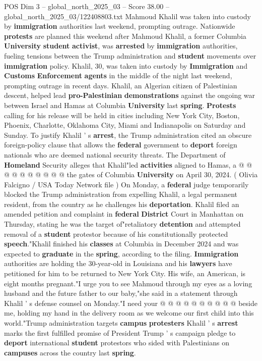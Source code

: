 \begin{textsample}{POS Dim 3 – global\_north\_2025\_03 – Score 38.00 – global\_north\_2025\_03/122408803.txt}  \label{ex:f3_pos_023}
Mahmoud Khalil was taken into custody by \textbf{immigration} authorities last weekend, prompting outrage.
Nationwide \textbf{protests} are planned this weekend after Mahmoud Khalil, a former Columbia \textbf{University} \textbf{student} \textbf{activist}, was \textbf{arrested} by \textbf{immigration} authorities, fueling tensions between the Trump administration and \textbf{student} movements over \textbf{immigration} policy.
Khalil, 30, was taken into custody by \textbf{Immigration} and \textbf{Customs} \textbf{Enforcement} \textbf{agents} in the middle of the night last weekend, prompting outrage in recent days.
Khalil, an Algerian citizen of Palestinian descent, helped lead \textbf{pro-Palestinian} \textbf{demonstrations} against the ongoing war between Israel and Hamas at Columbia \textbf{University} last \textbf{spring}. \textbf{Protests} calling for his release will be held in cities including New York City, Boston, Phoenix, Charlotte, Oklahoma City, Miami and Indianapolis on Saturday and Sunday.
To justify Khalil ' s \textbf{arrest}, the Trump administration cited an obscure foreign-policy clause that allows the \textbf{federal} government to \textbf{deport} foreign nationals who are deemed national security threats.
The Department of \textbf{Homeland} Security alleges that Khalil"led \textbf{activities} aligned to Hamas, a @ @ @ @ @ @ @ @ @ @ the gates of Columbia \textbf{University} on April 30, 2024. ( Olivia Falcigno / USA Today Network file ) On Monday, a \textbf{federal} judge temporarily blocked the Trump administration from expelling Khalil, a legal permanent resident, from the country as he challenges his \textbf{deportation}.
Khalil filed an amended petition and complaint in \textbf{federal} \textbf{District} Court in Manhattan on Thursday, stating he was the target of"retaliatory \textbf{detention} and attempted removal of a \textbf{student} protestor because of his constitutionally protected \textbf{speech}."Khalil finished his \textbf{classes} at Columbia in December 2024 and was expected to \textbf{graduate} in the \textbf{spring}, according to the filing. \textbf{Immigration} authorities are holding the 30-year-old in Louisiana and his \textbf{lawyers} have petitioned for him to be returned to New York City.
His wife, an American, is eight months pregnant."I urge you to see Mahmoud through my eyes as a loving husband and the future father to our baby,"she said in a statement through Khalil ' s defense counsel on Monday."I need your @ @ @ @ @ @ @ @ @ @ beside me, holding my hand in the delivery room as we welcome our first child into this world."Trump administration targets \textbf{campus} \textbf{protesters} Khalil ' s \textbf{arrest} marks the first fulfilled promise of President Trump ' s campaign pledge to \textbf{deport} international \textbf{student} protestors who sided with Palestinians on \textbf{campuses} across the country last \textbf{spring}.

\end{textsample}
